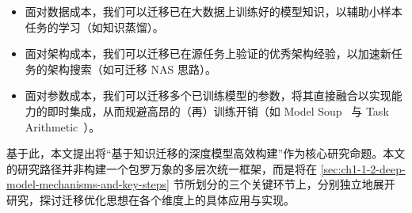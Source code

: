 \documentclass[../main.tex]{subfiles}
\begin{document}
\begin{itemize}[leftmargin=3em]
	\item 面对数据成本，我们可以迁移已在大数据上训练好的模型知识，以辅助小样本任务的学习（如知识蒸馏）\cite{distillingknowledgeneural_hinton_2015}。
	\item 面对架构成本，我们可以迁移已在源任务上验证的优秀架构经验，以加速新任务的架构搜索（如可迁移 NAS 思路）\cite{learningtransferablearchitectures_zoph_2018,neuralarchitecturesearch_elsken_2019}。
	\item 面对参数成本，我们可以迁移多个已训练模型的参数，将其直接融合以实现能力的即时集成，从而规避高昂的（再）训练开销（如 Model Soup~\cite{modelsoupsaveraging_wortsman_2022} 与 Task Arithmetic~\cite{editingmodelstask_ilharco_2023}）。
\end{itemize}

基于此，本文提出将“基于知识迁移的深度模型高效构建”作为核心研究命题。本文的研究路径并非构建一个包罗万象的多层次统一框架，而是将在 \ref{sec:ch1-1-2-deep-model-mechanisms-and-key-steps} 节所划分的三个关键环节上，分别独立地展开研究，探讨迁移优化思想在各个维度上的具体应用与实现。



\end{document}
